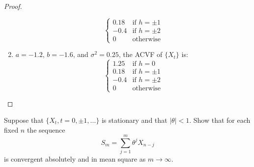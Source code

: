 \documentclass[12pt]{article}
\theoremstyle{definition}
\newenvironment{custompbm}[1]
  {\renewcommand\theproblem{#1}\problem}
  {\endproblem}
\begin{document}
\begin{proof}
\begin{enumerate}
\[\begin{cases}
          0.18 & \text{if $h=\pm1$}\\
          -0.4 & \text{if $h=\pm2$}\\
          0 & \text{otherwise}
        \end{cases}
      \]
    \item $a=-1.2$, $b=-1.6$, and $\sigma^2=0.25$, the ACVF of $\{X_t\}$ is:
      \[
        \begin{cases}
          1.25 & \text{if $h=0$}\\
          0.18 & \text{if $h=\pm1$}\\
          -0.4 & \text{if $h=\pm2$}\\
          0 & \text{otherwise}
        \end{cases}
      \]
  \end{enumerate}
\end{proof}




\begin{custompbm}{2.5}
  Suppose that $\{X_t, t=0, \pm1, \dots\}$ is stationary and that $|\theta|<1$.
  Show that for each fixed $n$ the sequence
  \[
    S_m = \sum_{j=1}^{m} \theta ^ j X_{n-j}
  \]
  is convergent absolutely and in mean square as $m \to \infty$.
\end{custompbm}
\end{document}
